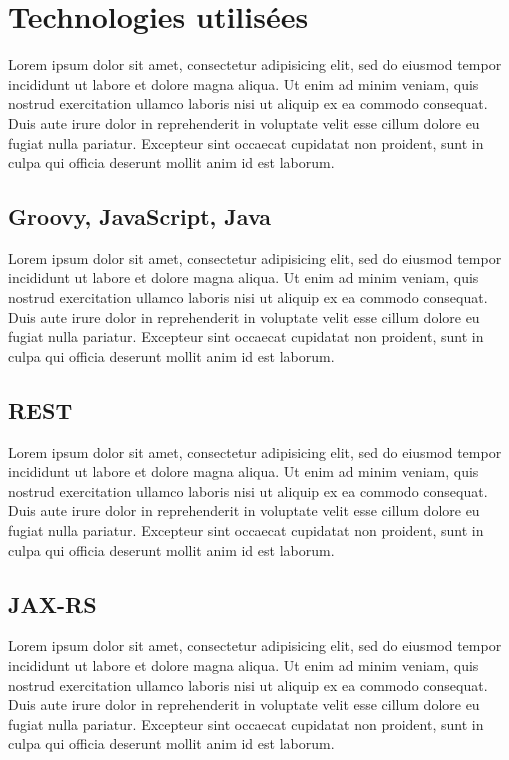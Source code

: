 \documentclass{article}
\begin{document}

\section{Technologies utilisées} %
\label{sec:technologies_utilisees}

Lorem ipsum dolor sit amet, consectetur adipisicing elit, sed do eiusmod tempor incididunt ut labore et dolore magna aliqua. Ut enim ad minim veniam, quis nostrud exercitation ullamco laboris nisi ut aliquip ex ea commodo consequat. Duis aute irure dolor in reprehenderit in voluptate velit esse cillum dolore eu fugiat nulla pariatur. Excepteur sint occaecat cupidatat non proident, sunt in culpa qui officia deserunt mollit anim id est laborum.

\subsection{Groovy, JavaScript, Java} %
\label{sub:groovy}
Lorem ipsum dolor sit amet, consectetur adipisicing elit, sed do eiusmod tempor incididunt ut labore et dolore magna aliqua. Ut enim ad minim veniam, quis nostrud exercitation ullamco laboris nisi ut aliquip ex ea commodo consequat. Duis aute irure dolor in reprehenderit in voluptate velit esse cillum dolore eu fugiat nulla pariatur. Excepteur sint occaecat cupidatat non proident, sunt in culpa qui officia deserunt mollit anim id est laborum.

\subsection{REST} %
\label{sub:rest}
Lorem ipsum dolor sit amet, consectetur adipisicing elit, sed do eiusmod tempor incididunt ut labore et dolore magna aliqua. Ut enim ad minim veniam, quis nostrud exercitation ullamco laboris nisi ut aliquip ex ea commodo consequat. Duis aute irure dolor in reprehenderit in voluptate velit esse cillum dolore eu fugiat nulla pariatur. Excepteur sint occaecat cupidatat non proident, sunt in culpa qui officia deserunt mollit anim id est laborum.

\subsection{JAX-RS} %
\label{sub:jax_rs}
Lorem ipsum dolor sit amet, consectetur adipisicing elit, sed do eiusmod tempor incididunt ut labore et dolore magna aliqua. Ut enim ad minim veniam, quis nostrud exercitation ullamco laboris nisi ut aliquip ex ea commodo consequat. Duis aute irure dolor in reprehenderit in voluptate velit esse cillum dolore eu fugiat nulla pariatur. Excepteur sint occaecat cupidatat non proident, sunt in culpa qui officia deserunt mollit anim id est laborum.
\end{document}
